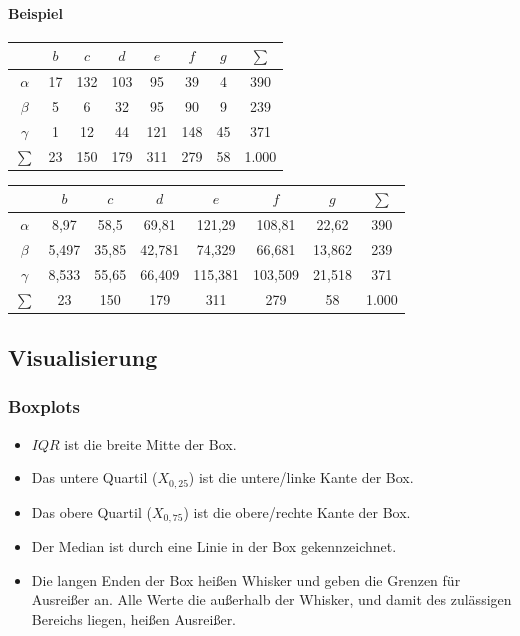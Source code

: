 \documentclass{scrartcl}
\begin{document}
\paragraph{Beispiel}

\begin{center}
	\begin{tabular}{|c|c|c|c|c|c|c|c|}
		\hline 
		& $ b $ & $ c $ & $ d $ & $ e $ & $ f $ & $ g $ & $ \sum $ \\ 
		\hline 
		$ \alpha $ & 17 & 132 & 103 & 95 & 39 & 4 & 390 \\ 
		\hline 
		$ \beta $ & 5 & 6 & 32 & 95 & 90 & 9 & 239 \\ 
		\hline 
		$ \gamma $ & 1 & 12 & 44 & 121 & 148 & 45 & 371 \\ 
		\hline 
		$ \sum $ & 23 & 150 & 179 & 311 & 279 & 58 & 1.000 \\ 
		\hline 
	\end{tabular} 
	\begin{tabular}{|c|c|c|c|c|c|c|c|}
		\hline 
		& $ b $ & $ c $ & $ d $ & $ e $ & $ f $ & $ g $ & $ \sum $ \\ 
		\hline 
		$ \alpha $ & 8,97 & 58,5 & 69,81 & 121,29 & 108,81 & 22,62 & 390 \\ 
		\hline 
		$ \beta $ & 5,497 & 35,85 & 42,781 & 74,329 & 66,681 & 13,862 & 239 \\ 
		\hline 
		$ \gamma $ & 8,533 & 55,65 & 66,409 & 115,381 & 103,509 & 21,518 & 371 
		\\ 
		\hline 
		$ \sum $ & 23 & 150 & 179 & 311 & 279 & 58 & 1.000 \\ 
		\hline 
	\end{tabular} 
\end{center}

\subsection{Visualisierung}

\subsubsection{Boxplots}

\begin{itemize}
	\item $ IQR $ ist die breite Mitte der Box.
	\item Das untere Quartil ($ X_{0,25} $) ist die untere/linke Kante der Box.
	\item Das obere Quartil ($ X_{0,75} $) ist die obere/rechte Kante der Box.
	\item Der Median ist durch eine Linie in der Box gekennzeichnet.
	\item Die langen Enden der Box heißen Whisker und geben die Grenzen für 
	Ausreißer an. Alle Werte die außerhalb der Whisker, und damit des 
	zulässigen Bereichs liegen, heißen Ausreißer.
\end{itemize}
\end{document}
